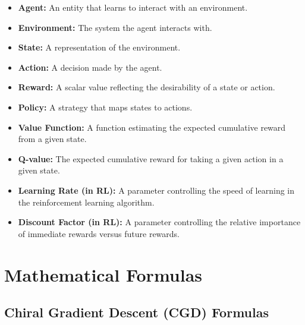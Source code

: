 \documentclass{article}
\begin{document}
\begin{itemize}
    \item \textbf{Agent:} An entity that learns to interact with an environment.
    \item \textbf{Environment:} The system the agent interacts with.
    \item \textbf{State:} A representation of the environment.
    \item \textbf{Action:} A decision made by the agent.
    \item \textbf{Reward:} A scalar value reflecting the desirability of a state or action.
    \item \textbf{Policy:} A strategy that maps states to actions.
    \item \textbf{Value Function:} A function estimating the expected cumulative reward from a given state.
    \item \textbf{Q-value:} The expected cumulative reward for taking a given action in a given state.
    \item \textbf{Learning Rate (in RL): } A parameter controlling the speed of learning in the reinforcement learning algorithm.
    \item \textbf{Discount Factor (in RL): }  A parameter controlling the relative importance of immediate rewards versus future rewards.
\end{itemize}


\section{Mathematical Formulas}

\subsection{Chiral Gradient Descent (CGD) Formulas}
\end{document}
